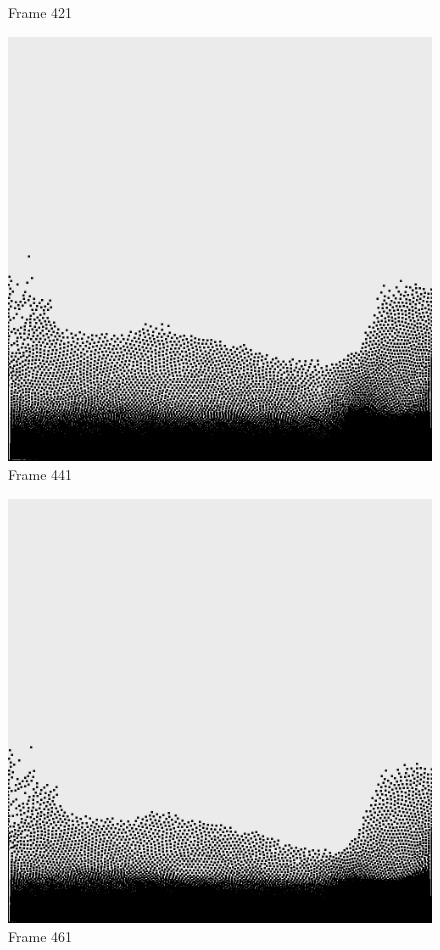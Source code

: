 \documentclass[a4paper, 12pt, oneside]{book}
\begin{document}
\begin{figure}[!ht]
\begin{center}
            Frame 421
        \end{center}
    \endminipage
    \hfill
        \begin{center}
            \includegraphics[width=\linewidth]{images/test_case_2/441.png}
            Frame 441
        \end{center}
    \endminipage
    \hfill
        \begin{center}
            \includegraphics[width=\linewidth]{images/test_case_2/461.png}
            Frame 461
        \end{center}
    \endminipage
    \hfill


\end{figure}
\end{document}
